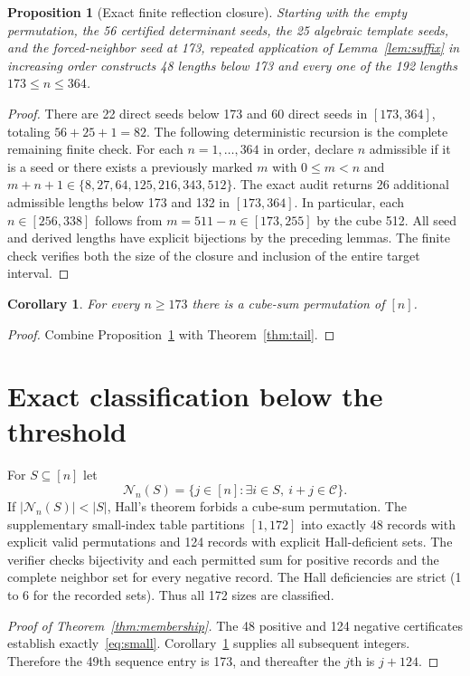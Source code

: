 \documentclass[9pt]{extarticle}
\newtheorem{proposition}[theorem]{Proposition}
\newtheorem{corollary}[theorem]{Corollary}
\newcommand{\C}{\mathcal C}
\begin{document}
\begin{proposition}[Exact finite reflection closure]\label{prop:closure}
Starting with the empty permutation, the 56 certified determinant seeds, the 25 algebraic template seeds, and the forced-neighbor seed at 173, repeated application of Lemma~\ref{lem:suffix} in increasing order constructs 48 lengths below 173 and \emph{every} one of the 192 lengths $173\le n\le364$.
\end{proposition}
\begin{proof}
There are 22 direct seeds below 173 and 60 direct seeds in $[173,364]$, totaling $56+25+1=82$. The following deterministic recursion is the complete remaining finite check. For each $n=1,\ldots,364$ in order, declare $n$ admissible if it is a seed or there exists a previously marked $m$ with $0\le m<n$ and $m+n+1\in\{8,27,64,125,216,343,512\}$. The exact audit returns 26 additional admissible lengths below 173 and 132 in $[173,364]$. In particular, each $n\in[256,338]$ follows from $m=511-n\in[173,255]$ by the cube 512. All seed and derived lengths have explicit bijections by the preceding lemmas. The finite check verifies both the size of the closure and inclusion of the entire target interval.
\end{proof}
\begin{corollary}\label{cor:existence}
For every $n\ge173$ there is a cube-sum permutation of $[n]$.
\end{corollary}
\begin{proof}
Combine Proposition~\ref{prop:closure} with Theorem~\ref{thm:tail}.
\end{proof}

\section{Exact classification below the threshold}\label{sec:small}
For $S\subseteq[n]$ let
\[\mathcal N_n(S)=\{j\in[n]:\exists i\in S,\ i+j\in\C\}.\]
If $|\mathcal N_n(S)|<|S|$, Hall's theorem \cite{hall} forbids a cube-sum permutation. The supplementary small-index table partitions $[1,172]$ into exactly 48 records with explicit valid permutations and 124 records with explicit Hall-deficient sets. The verifier checks bijectivity and each permitted sum for positive records and the complete neighbor set for every negative record. The Hall deficiencies are strict (1 to 6 for the recorded sets). Thus all 172 sizes are classified.
\begin{proof}[Proof of Theorem~\ref{thm:membership}]
The 48 positive and 124 negative certificates establish exactly~\eqref{eq:small}. Corollary~\ref{cor:existence} supplies all subsequent integers. Therefore the 49th sequence entry is 173, and thereafter the $j$th is $j+124$.
\end{proof}
\end{document}
